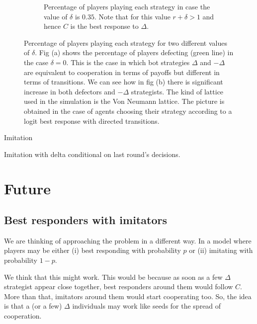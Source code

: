 \documentclass{article}
\begin{document}
\begin{figure}[htbp]
\begin{subfigure}[t]{0.47\textwidth}
  \caption{Percentage of players playing each strategy in case the value of $\delta$ is $0.35$. Note that for this value $r+\delta >1$ and hence $C$ is the best response to $\Delta$.}
  \label{fig:4strat_delta} 
\end{subfigure}
\caption{Percentage of players playing each strategy for two different values of $\delta$.
Fig (a) shows the percentage of players defecting (green line) in the case $\delta =0$. This is the case in which bot strategies $\Delta$ and $-\Delta$ are equivalent to cooperation in terms of payoffs but different in terms of transitions.
We can see how in fig (b) there is significant increase in both defectors and $-\Delta$ strategists.
The kind of lattice used in the simulation is the Von Neumann lattice.
The picture is obtained in the case of agents choosing their strategy according to a logit best response with directed transitions.
}
\label{fig:4strat}
\end{figure} 

Imitation

Imitation with delta conditional on last round's decisions.

\section{Future}

\subsection{Best responders with imitators}
We are thinking of approaching the problem in a different way. In a model where players may be either (i) best responding with probability $p$ or (ii) imitating with probability $1-p$. 

We think that this might work. This would be because as soon as a few $\Delta$ strategist appear close together, best responders around them would follow $C$. More than that, imitators around them would start cooperating too. So, the idea is that a (or a few) $\Delta$ individuals may work like seeds for the spread of cooperation.

\end{document}
